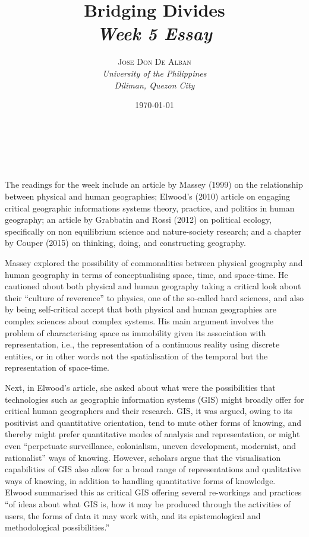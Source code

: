 \documentclass[a4paper, 10.5pt]{article} %
\title{\textbf{Bridging Divides}\\ %
\textsl{Week 5 Essay}} %
\author{\textsc{Jose Don De Alban} %
\\{\textit{University of the Philippines} %
\\{\textit{Diliman, Quezon City}}}} %
\date{\today} %
\makeatletter
\renewcommand{\maketitle}
{
\begin{flushright} %
{\LARGE\@title} %
\vspace{40pt} %

{\large\@author} %
\\\@date %

\vspace{10pt} %
\end{flushright}
}
\makeatother
\begin{document}
\maketitle %


\section*{}

The readings for the week include an article by Massey (1999) \cite{massey_1999} on the relationship between physical and human geographies; Elwood's (2010) \cite{elwood_2010} article on engaging critical geographic informations systems theory, practice, and politics in human geography; an article by Grabbatin and Rossi (2012) \cite{grabbatin_rossi_2012} on political ecology, specifically on non equilibrium science and nature-society research; and a chapter by Couper (2015) \cite{couper_2015} on thinking, doing, and constructing geography.

Massey explored the possibility of commonalities between physical geography and human geography in terms of conceptualising space, time, and space-time. He cautioned about both physical and human geography taking a critical look about their \enquote{culture of reverence} to physics, one of the so-called hard sciences, and also by being self-critical accept that both physical and human geographies are complex sciences about complex systems. His main argument involves the problem of characterising space as immobility given its association with representation, i.e., the representation of a continuous reality using discrete entities, or in other words not the spatialisation of the temporal but the representation of space-time.

Next, in Elwood's article, she asked about what were the possibilities that technologies such as geographic information systems (GIS) might broadly offer for critical human geographers and their research. GIS, it was argued, owing to its positivist and quantitative orientation, tend to mute other forms of knowing, and thereby might prefer quantitative modes of analysis and representation, or might even \enquote{perpetuate surveillance, colonialism, uneven development, modernist, and rationalist} ways of knowing. However, scholars argue that the visualisation capabilities of GIS also allow for a broad range of representations and qualitative ways of knowing, in addition to handling quantitative forms of knowledge. Elwood summarised this as critical GIS offering several re-workings and practices \enquote{of ideas about what GIS is, how it may be produced through the activities of users, the forms of data it may work with, and its epistemological and methodological possibilities.}
\end{document}
